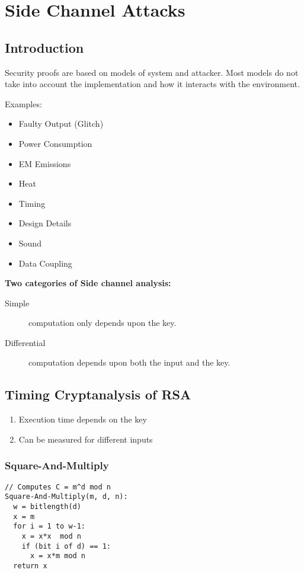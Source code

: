 
\section{Side Channel Attacks}
\subsection{Introduction}
Security proofs are based on models of system and attacker. Most models do not take
into account the implementation and how it interacts with the environment.

Examples:
\begin{itemize}
  \item Faulty Output (Glitch)
  \item Power Consumption
  \item EM Emissions
  \item Heat
  \item Timing
  \item Design Details
  \item Sound
  \item Data Coupling
\end{itemize}

\textbf{Two categories of Side channel analysis:}
\begin{description}
  \item[Simple] computation only depends upon the key.
  \item[Differential] computation depends upon both the input and the key.
\end{description}

\subsection{Timing Cryptanalysis of RSA}
\begin{enumerate}
  \item Execution time depends on the key
  \item Can be measured for different inputs
\end{enumerate}


\subsubsection{Square-And-Multiply}
\begin{lstlisting}
// Computes C = m^d mod n
Square-And-Multiply(m, d, n):
  w = bitlength(d)
  x = m
  for i = 1 to w-1:
    x = x*x  mod n
    if (bit i of d) == 1:
      x = x*m mod n
  return x
\end{lstlisting}

